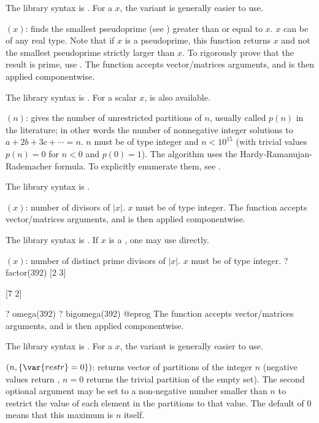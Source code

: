 The library syntax is .
For a  $x$, the variant
 is generally easier to use.

$(x)$: \label{se:nextprime}finds the smallest pseudoprime (see
) greater than or equal to $x$. $x$ can be of any real
type. Note that if $x$ is a pseudoprime, this function returns $x$ and not
the smallest pseudoprime strictly larger than $x$. To rigorously prove that
the result is prime, use .
The function accepts vector/matrices arguments, and is then applied
componentwise.

The library syntax is .
For a scalar $x$,
 is also available.

$(n)$: \label{se:numbpart}gives the number of unrestricted partitions of
$n$, usually called $p(n)$ in the literature; in other words the number of
nonnegative integer solutions to $a+2b+3c+\cdots=n$. $n$ must be of type
integer and $n<10^{15}$ (with trivial values $p(n) = 0$ for $n < 0$ and
$p(0) = 1$). The algorithm uses the Hardy-Ramanujan-Rademacher formula.
To explicitly enumerate them, see .

The library syntax is .

$(x)$: \label{se:numdiv}number of divisors of $|x|$. $x$ must be of type integer.
The function accepts vector/matrices arguments, and is then applied
componentwise.

The library syntax is .
If $x$ is a , one may use  directly.

$(x)$: \label{se:omega}number of distinct prime divisors of $|x|$. $x$ must be of type integer.
\bprog
? factor(392)
[2 3]

[7 2]

? omega(392)
? bigomega(392)
@eprog
The function accepts vector/matrices arguments, and is then applied
componentwise.

The library syntax is .
For a  $x$, the variant
 is generally easier to use.

$(n,\{\var{restr}=0\})$: \label{se:partitions}returns vector of partitions of the integer $n$ (negative values return
\kbd{[]}, $n = 0$ returns the trivial partition of the empty set).
The second optional argument may be set to a non-negative number smaller than
$n$ to restrict the value of each element in the partitions to that value.
The default of 0 means that this maximum is $n$ itself.

